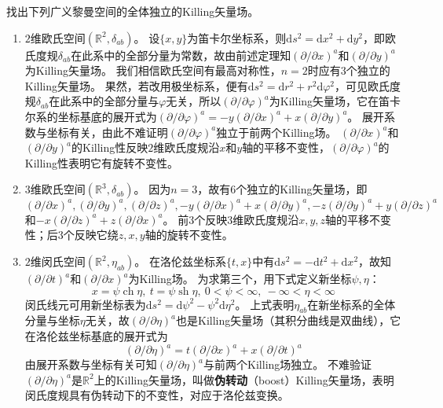 \begin{example}
	找出下列广义黎曼空间的全体独立的Killing矢量场。
	\begin{enumerate}[（1）]
		\item $2$维欧氏空间$(\mathbb{R}^2, \delta_{ab})$。
		      设$\{x, y\}$为笛卡尔坐标系，则$\mathrm{d}s^2 = \mathrm{d}x^2 + \mathrm{d}y^2$，即欧氏度规$\delta_{ab}$在此系中的全部分量为常数，故由前述定理知$(\partial / \partial x)^a$和$(\partial / \partial y)^a$为Killing矢量场。
		      我们相信欧氏空间有最高对称性，$n = 2$时应有$3$个独立的Killing矢量场。
		      果然，若改用极坐标系，便有$\mathrm{d}s^2 = \mathrm{d}r^2 + r^2\mathrm{d}\varphi^2$，可见欧氏度规$\delta_{ab}$在此系中的全部分量与$\varphi$无关，所以$(\partial / \partial \varphi)^a$为Killing矢量场，它在笛卡尔系的坐标基底的展开式为$(\partial / \partial \varphi)^a = -y(\partial / \partial x)^a + x(\partial / \partial y)^a$。
		      展开系数与坐标有关，由此不难证明$(\partial / \partial \varphi)^a$独立于前两个Killing场。
		      $(\partial / \partial x)^a$和$(\partial / \partial y)^a$的Killing性反映$2$维欧氏度规沿$x$和$y$轴的平移不变性，$(\partial / \partial \varphi)^a$的Killing性表明它有旋转不变性。
		\item $3$维欧氏空间$(\mathbb{R}^3, \delta_{ab})$。
		      因为$n = 3$，故有$6$个独立的Killing矢量场，即$(\partial / \partial x)^a, (\partial / \partial y)^a, (\partial / \partial z)^a, -y(\partial / \partial x)^a + x(\partial / \partial y)^a, -z(\partial / \partial y)^a + y(\partial / \partial z)^a$和$-x(\partial / \partial z)^a + z(\partial / \partial x)^a$。
		      前$3$个反映$3$维欧氏度规沿$x, y, z$轴的平移不变性；后$3$个反映它绕$z, x, y$轴的旋转不变性。
		\item $2$维闵氏空间$(\mathbb{R}^2, \eta_{ab})$。
		      在洛伦兹坐标系$\{t, x\}$中有$\mathrm{d}s^2 = -\mathrm{d}t^2 + \mathrm{d}x^2$，故知$(\partial / \partial t)^a$和$(\partial / \partial x)^a$为Killing场。
		      为求第三个，用下式定义新坐标$\psi, \eta$：
		      $$x = \psi\operatorname{ch}\eta, ~ t = \psi\operatorname{sh}\eta, ~ 0 < \psi < \infty, ~ -\infty < \eta < \infty$$
		      闵氏线元可用新坐标表为$\mathrm{d}s^2 = \mathrm{d}\psi^2 - \psi^2\mathrm{d}\eta^2$。
		      上式表明$\eta_{ab}$在新坐标系的全体分量与坐标$\eta$无关，故$(\partial / \partial \eta)^a$也是Killing矢量场（其积分曲线是双曲线），它在洛伦兹坐标基底的展开式为
		      $$(\partial / \partial \eta)^a = t(\partial / \partial x)^a + x(\partial / \partial t)^a$$
		      由展开系数与坐标有关可知$(\partial / \partial \eta)^a$与前两个Killing场独立。
		      不难验证$(\partial / \partial \eta)^a$是$\mathbb{R}^2$上的Killing矢量场，叫做\textbf{伪转动}（boost）Killing矢量场，表明闵氏度规具有伪转动下的不变性，对应于洛伦兹变换。

\end{enumerate}
\end{example}
